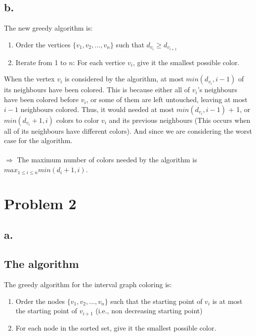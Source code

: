 \documentclass{article}
\begin{document}
\pagebreak
\subsection*{b.}
The new greedy algorithm is:
\begin{enumerate}
\item Order the vertices $\{v_1, v_2, ..., v_n\}$ such that $d_{v_{i}} \geq d_{v_{i+1}}$
\item Iterate from 1 to $n$: For each vertice $v_{i}$, give it the smallest possible color.
\end{enumerate}
When the vertex $v_i$ is considered by the algorithm, at most $min(d_{v_i}, i-1)$ of its neighbours have been colored. This is because either all of $v_i$'s neighbours have been colored before $v_i$, or some of them are left untouched, leaving at most $i-1$ neighbours colored. Thus, it would needed at most $min(d_{v_i}, i-1)$ + 1, or $min(d_{v_i} + 1, i)$ colors to color $v_i$ and its previous neighbours (This occurs when all of its neighbours have different colors). And since we are considering the worst case for the algorithm.\\\\
$\Rightarrow$ The maximum number of colors needed by the algorithm is $max_{1 \leq i \leq n}min(d_{i} + 1, i)$.

\pagebreak
\section*{Problem 2}
\subsection*{a.}
\subsection*{The algorithm}
The greedy algorithm for the interval graph coloring is:
\begin{enumerate}
\item Order the nodes $\{v_1, v_2, ..., v_n\}$ such that the starting point of $v_{i}$ is at most the starting point of $v_{i+1}$ (i.e., non decreasing starting point)
\item For each node in the sorted set, give it the smallest possible color.
\end{enumerate}
\end{document}
